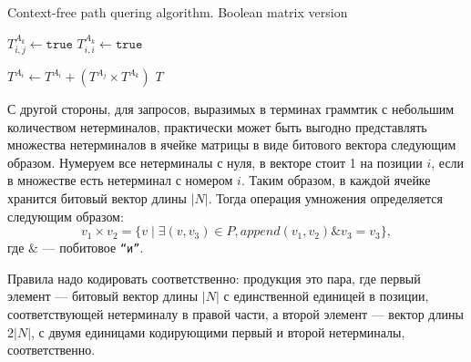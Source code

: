\begin{algorithm}
\begin{algorithmic}[1]
\caption{Context-free path quering algorithm. Boolean matrix version}
\label{lst:algo1}
          {$T^{A_k}_{i,j} \gets \texttt{true}$}
    \EndFor
       {$T^{A_k}_{i,i} \gets \texttt{true}$}
    \EndFor

          { $T^{A_i} \gets T^{A_i} + (T^{A_j} \times T^{A_k})$ } 
        \EndFor
    \EndWhile
\State \Return $T$
\EndFunction
\end{algorithmic}
\end{algorithm}

С другой стороны, для запросов, выразимых в терминах граммтик с небольшим количеством нетерминалов, практически может быть выгодно представлять множества нетерминалов в ячейке матрицы в виде битового вектора следующим образом.
Нумеруем все нетерминалы с нуля, в векторе стоит 1 на позиции $i$, если в множестве есть нетерминал с номером $i$.
Таким образом, в каждой ячейке хранится битовый вектор длины $|N|$.
Тогда операция умножения определяется следующим образом:
$$v_1 \times v_2 = \{v \mid \exists (v,v_3) \in P, \textit{append}(v_1, v_2) \& v_3 = v_3\},$$ где $\&$ --- побитовое \texttt{``и''}.

Правила надо кодировать соответственно: продукция это пара, где первый элемент --- битовый вектор длины $|N|$ с единственной единицей в позиции, соответствующей нетерминалу в правой части, а второй элемент --- вектор длины $2|N|$, с двумя единицами кодирующими первый и второй нетерминалы, соответственно.

